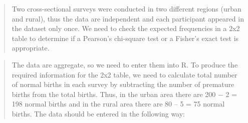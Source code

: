 \documentclass[
]{memoir}
\newenvironment{Shaded}{\begin{snugshade}}{\end{snugshade}}
\newcommand{\AttributeTok}[1]{\textcolor[rgb]{0.77,0.63,0.00}{#1}}
\newcommand{\DecValTok}[1]{\textcolor[rgb]{0.00,0.00,0.81}{#1}}
\newcommand{\FunctionTok}[1]{\textcolor[rgb]{0.00,0.00,0.00}{#1}}
\newcommand{\NormalTok}[1]{#1}
\newcommand{\OtherTok}[1]{\textcolor[rgb]{0.56,0.35,0.01}{#1}}
\newcommand{\SpecialCharTok}[1]{\textcolor[rgb]{0.00,0.00,0.00}{#1}}
\newcommand{\StringTok}[1]{\textcolor[rgb]{0.31,0.60,0.02}{#1}}
\begin{document}
\begin{quote}
Two cross-sectional surveys were conducted in two different regions (urban and rural), thus the data are independent and each participant appeared in the dataset only once. We need to check the expected frequencies in a 2x2 table to determine if a Pearson's chi-square test or a Fisher's exact test is appropriate.
\end{quote}

\begin{quote}
The data are aggregate, so we need to enter them into R. To produce the required information for the 2x2 table, we need to calculate total number of normal births in each survey by subtracting the number of premature births from the total births. Thus, in the urban area there are 200 − 2 = 198 normal births and in the rural area there are 80 -- 5 = 75 normal births. The data should be entered in the following way:
\end{quote}

\begin{Shaded}
\end{Shaded}
\end{document}
